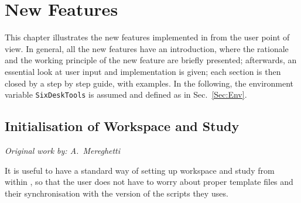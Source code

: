\chapter{New Features} \label{NewFeatures}
This chapter illustrates the new features implemented in \SIXDESK{} from
the user point of view. In general, all the new features have an introduction,
where the rationale and the working principle of the new feature are briefly
presented; afterwards, an essential look at user input and implementation
is given; each section is then closed by a step by step guide, with
examples. In the following, the environment variable
\texttt{SixDeskTools} is assumed and defined as in Sec.~\ref{Sec:Env}.

\section{Initialisation of Workspace and Study} \label{Initialisation}
\begin{flushright}
\emph{Original work by: A.~Mereghetti}
\end{flushright}
It is useful to have a standard way of setting up workspace and study
from within \SIXDESK{}, so that the user does not have to
worry about proper template files and their synchronisation with the
version of the scripts they uses.

